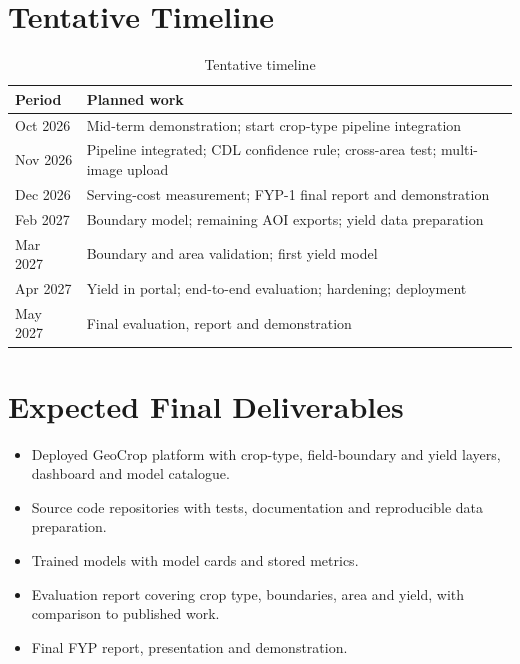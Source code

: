 \section{Tentative Timeline}
\begin{table}[htbp]
\centering\small
\caption{Tentative timeline}
\label{tab:timeline}
\begin{tabularx}{\textwidth}{L{3.2cm} Y}
\toprule
\textbf{Period} & \textbf{Planned work}\\
\midrule
Oct 2026 & Mid-term demonstration; start crop-type pipeline integration\\
Nov 2026 & Pipeline integrated; CDL confidence rule; cross-area test; multi-image upload\\
Dec 2026 & Serving-cost measurement; FYP-1 final report and demonstration\\
Feb 2027 & Boundary model; remaining AOI exports; yield data preparation\\
Mar 2027 & Boundary and area validation; first yield model\\
Apr 2027 & Yield in portal; end-to-end evaluation; hardening; deployment\\
May 2027 & Final evaluation, report and demonstration\\
\bottomrule
\end{tabularx}
\end{table}

\section{Expected Final Deliverables}
\begin{itemize}
  \item Deployed GeoCrop platform with crop-type, field-boundary and yield layers, dashboard and model
        catalogue.
  \item Source code repositories with tests, documentation and reproducible data preparation.
  \item Trained models with model cards and stored metrics.
  \item Evaluation report covering crop type, boundaries, area and yield, with comparison to
        published work.
  \item Final FYP report, presentation and demonstration.
\end{itemize}
